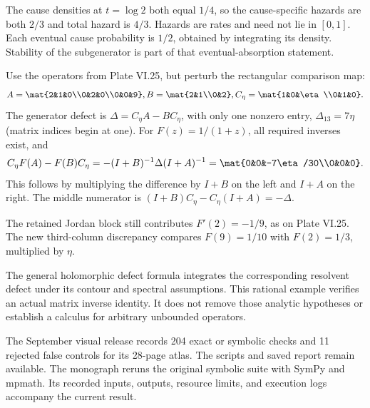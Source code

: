 The cause densities at $t=\log2$ both equal $1/4$, so the cause-specific hazards are both $2/3$ and total hazard is $4/3$. Hazards are rates and need not lie in $[0,1]$. Each eventual cause probability is $1/2$, obtained by integrating its density. Stability of the subgenerator is part of that eventual-absorption statement.

Use the operators from Plate VI.25, but perturb the rectangular comparison map:
\[
A=\mat{2&1&0\\0&2&0\\0&0&9},\quad
B=\mat{2&1\\0&2},\quad
C_\eta=\mat{1&0&\eta\\0&1&0}.
\]
The generator defect is $\Delta=C_\eta A-BC_\eta$, with only one nonzero entry, $\Delta_{13}=7\eta$ (matrix indices begin at one).
For $F(z)=1/(1+z)$, all required inverses exist, and
\[
C_\eta F(A)-F(B)C_\eta
=-(I+B)^{-1}\Delta(I+A)^{-1}
=\mat{0&0&-7\eta/30\\0&0&0}.
\]
This follows by multiplying the difference by $I+B$ on the left and $I+A$ on the right. The middle numerator is $(I+B)C_\eta-C_\eta(I+A)=-\Delta$.

The retained Jordan block still contributes $F'(2)=-1/9$, as on Plate VI.25. The new third-column discrepancy compares $F(9)=1/10$ with $F(2)=1/3$, multiplied by $\eta$.

The general holomorphic defect formula integrates the corresponding resolvent defect under its contour and spectral assumptions. This rational example verifies an actual matrix inverse identity. It does not remove those analytic hypotheses or establish a calculus for arbitrary unbounded operators.

The September visual release records 204 exact or symbolic checks and 11 rejected false controls for its 28-page atlas. The scripts and saved report remain available. The monograph reruns the original symbolic suite with SymPy and mpmath. Its recorded inputs, outputs, resource limits, and execution logs accompany the current result.

